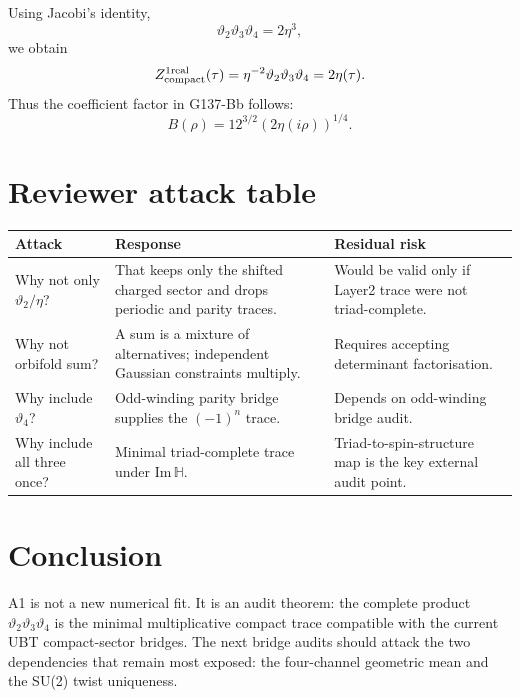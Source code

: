 \documentclass[12pt,a4paper]{article}
\begin{document}
Using Jacobi's identity,
\[
  \vartheta_2\vartheta_3\vartheta_4=2\eta^3,
\]
we obtain
\[
  Z_{\rm compact}^{1\rm real}(\tau)
  =\eta^{-2}\vartheta_2\vartheta_3\vartheta_4
  =2\eta(\tau).
\]
Thus the coefficient factor in G137-Bb follows:
\[
  B(\rho)=12^{3/2}(2\eta(i\rho))^{1/4}.
\]

\section{Reviewer attack table}

\begin{longtable}{p{}p{}p{}}
\toprule
Attack & Response & Residual risk \\
\midrule
\endhead
Why not only $\vartheta_2/\eta$? & That keeps only the shifted charged sector and drops periodic and parity traces. & Would be valid only if Layer2 trace were not triad-complete. \\
Why not orbifold sum? & A sum is a mixture of alternatives; independent Gaussian constraints multiply. & Requires accepting determinant factorisation. \\
Why include $\vartheta_4$? & Odd-winding parity bridge supplies the $(-1)^n$ trace. & Depends on odd-winding bridge audit. \\
Why include all three once? & Minimal triad-complete trace under $\mathrm{Im}\,\mathbb H$. & Triad-to-spin-structure map is the key external audit point. \\
\bottomrule
\end{longtable}

\section{Conclusion}

A1 is not a new numerical fit.  It is an audit theorem: the complete product
$\vartheta_2\vartheta_3\vartheta_4$ is the minimal multiplicative compact trace
compatible with the current UBT compact-sector bridges.  The next bridge audits
should attack the two dependencies that remain most exposed: the four-channel
geometric mean and the SU(2) twist uniqueness.
\end{document}
